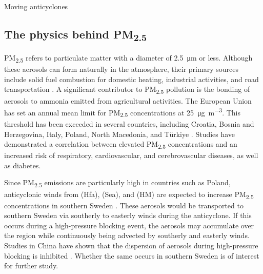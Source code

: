 Moving anticyclones

\subsection{The physics behind \texorpdfstring{PM\textsubscript{2.5}}{PM2.5}}
PM\textsubscript{2.5} refers to particulate matter with a diameter of \SI{2.5}{\micro\meter} or less. Although these aerosols can form naturally in the atmosphere, their primary sources include solid fuel combustion for domestic heating, industrial activities, and road transportation \cite{europeanenvironmentagencyEuropesAirQuality2024}. A significant contributor to PM\textsubscript{2.5} pollution is the bonding of aerosols to ammonia emitted from agricultural activities. The European Union has set an annual mean limit for PM\textsubscript{2.5} concentrations at \SI{25}{\micro\gram\per\cubic\meter}. This threshold has been exceeded in several countries, including Croatia, Bosnia and Herzegovina, Italy, Poland, North Macedonia, and Türkiye \cite{europeanenvironmentagencyEuropesAirQuality2024}. Studies have demonstrated a correlation between elevated PM\textsubscript{2.5} concentrations and an increased risk of respiratory, cardiovascular, and cerebrovascular diseases, as well as diabetes.

Since PM\textsubscript{2.5} emissions are particularly high in countries such as Poland, anticyclonic winds from (Hfa), (Sea), and (HM) are expected to increase PM\textsubscript{2.5} concentrations in southern Sweden \cite{europeanenvironmentagencyEuropesAirQuality2024}. These aerosols would be transported to southern Sweden via southerly to easterly winds during the anticyclone. If this occurs during a high-pressure blocking event, the aerosols may accumulate over the region while continuously being advected by southerly and easterly winds. Studies in China have shown that the dispersion of aerosols during high-pressure blocking is inhibited \cite{caiImpactBlockingStructure2020}. Whether the same occurs in southern Sweden is of interest for further study.
